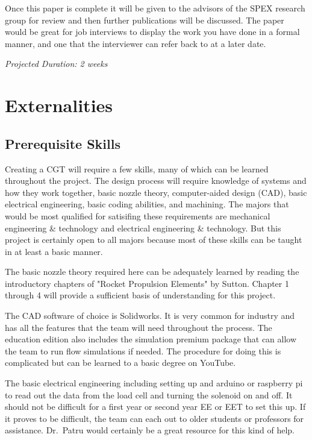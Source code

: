 \documentclass[conference]{IEEEtran} %
\begin{document}
    Once this paper is complete it will be given to the advisors of the SPEX research group for review and then further publications will be discussed. The paper would
    be great for job interviews to display the work you have done in a formal manner, and one that the interviewer can refer back to at a later date.

    \textit{Projected Duration: 2 weeks}

\section{Externalities}
\subsection{Prerequisite Skills}

Creating a CGT will require a few skills, many of which can be learned throughout the project. The design process will require knowledge of systems and how they
work together, basic nozzle theory, computer-aided design (CAD), basic electrical engineering, basic coding abilities, and machining. The majors that would
be most qualified for satisifing these requirements are mechanical engineering \& technology and electrical engineering \& technology. But this project is certainly
open to all majors because most of these skills can be taught in at least a basic manner.

The basic nozzle theory required here can be adequately learned by reading the introductory chapters of "Rocket Propulsion Elements" by Sutton\cite{RPE}. Chapter 1 through 4 will
provide a sufficient basis of understanding for this project.

 The CAD software of choice is Solidworks. It is very common for industry and has all the features that the team
will need throughout the process. The education edition also includes the simulation premium package that can allow the team to run flow simulations if needed. The procedure for
doing this is complicated but can be learned to a basic degree on YouTube.

The basic electrical engineering including setting up and arduino or raspberry pi to read out the data from the load cell and turning the solenoid on and off. It
should not be difficult for a first year or second year EE or EET to set this up. If it proves to be difficult, the team can each out to older students or professors for assistance.
Dr.\ Patru would certainly be a great resource for this kind of help.
\end{document}
